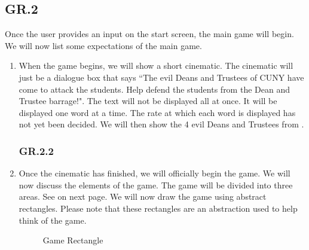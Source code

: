\documentclass[12pt, letterpaper]{article}
\begin{document}
    \subsection*{GR.2}
    
    Once the user provides an input on the start screen, the main game will begin. We will now list some expectations of the main game. 
    \begin{enumerate}[label=]
        \subsubsection*{GR.2.1}
        \label{numAliens}
        \item When the game begins, we will show a short cinematic. The cinematic will just be a dialogue box that says ``The evil Deans and Trustees of CUNY have come to attack the students. Help defend the students from the Dean and Trustee barrage!". The text will not be displayed all at once. It will be displayed one word at a time. The rate at which each word is displayed has not yet been decided. We will then show the 4 evil Deans and Trustees from .
        \subsubsection*{GR.2.2}
        \item Once the cinematic has finished, we will officially begin the game. We will now discuss the elements of the game. The game will be divided into three areas. See  on next page. We will now draw the game using abstract rectangles. Please note that these rectangles are an abstraction used to help think of the game. 
        
        \begin{figure}[!htb]
        \begin{center}
        \caption{Game Rectangle}
        \label{fig:game_rect}
        \end{center}
        \end{figure}

\end{enumerate}
\end{document}
